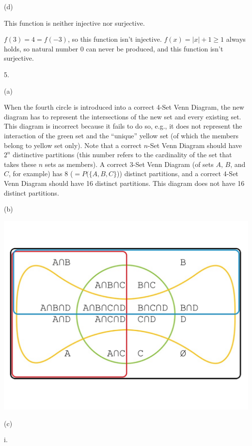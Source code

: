 \documentclass[UTF8,12pt,letterpaper,oneside]{amsart}
\begin{document}
(d) 

This function is neither injective nor surjective.

$f(3) = 4 = f(-3)$, so this function isn't injective. $f(x) = |x| + 1 \geq 1$ always holds, so natural number 0 can never be produced, and this function isn't surjective.

5.

(a) 

When the fourth circle is introduced into a correct 4-Set Venn Diagram, the new diagram has to represent the intersections of the new set and every existing set. This diagram is incorrect because it fails to do so, e.g., it does not represent the interaction of the green set and the ``unique'' yellow set (of which the members belong to yellow set only). Note that a correct $n$-Set Venn Diagram should have $2^n$ distinctive partitions (this number refers to the cardinality of the set that takes these $n$ sets as members). A correct 3-Set Venn Diagram (of sets $A$, $B$, and $C$, for example) has 8 ($= P(\{A, B, C\}$)) distinct partitions, and a correct 4-Set Venn Diagram should have 16 distinct partitions. This diagram does not have 16 distinct partitions.

(b)

\includegraphics[scale=0.4]{hw1-4venn.pdf}

\newpage

(c)

i. 
\end{document}
